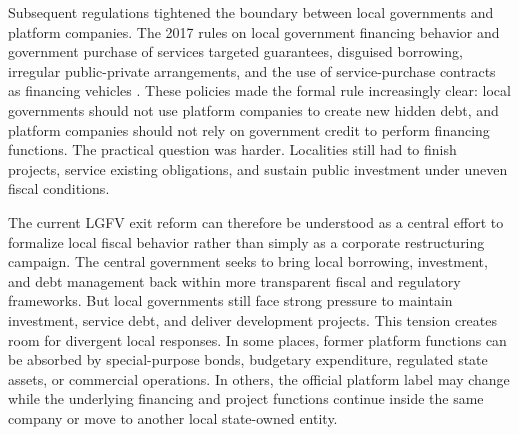 Subsequent regulations tightened the boundary between local governments and
platform companies. The 2017 rules on local government financing behavior and
government purchase of services targeted guarantees, disguised borrowing,
irregular public-private arrangements, and the use of service-purchase contracts
as financing vehicles \citep{mof2017_50,mof2017_87}. These policies made the
formal rule increasingly clear: local governments should not use platform
companies to create new hidden debt, and platform companies should not rely on
government credit to perform financing functions. The practical question was
harder. Localities still had to finish projects, service existing obligations,
and sustain public investment under uneven fiscal conditions.

The current LGFV exit reform can therefore be understood as a central effort to
formalize local fiscal behavior rather than simply as a corporate restructuring
campaign. The central government seeks to bring local borrowing, investment, and
debt management back within more transparent fiscal and regulatory frameworks.
But local governments still face strong pressure to maintain investment, service
debt, and deliver development projects. This tension creates room for divergent
local responses. In some places, former platform functions can be absorbed by
special-purpose bonds, budgetary expenditure, regulated state assets, or
commercial operations. In others, the official platform label may change while
the underlying financing and project functions continue inside the same company
or move to another local state-owned entity.
